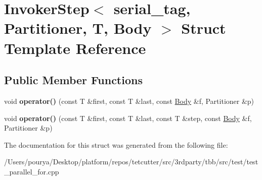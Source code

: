 \hypertarget{structInvokerStep_3_01serial__tag_00_01Partitioner_00_01T_00_01Body_01_4}{}\section{Invoker\+Step$<$ serial\+\_\+tag, Partitioner, T, Body $>$ Struct Template Reference}
\label{structInvokerStep_3_01serial__tag_00_01Partitioner_00_01T_00_01Body_01_4}
\subsection*{Public Member Functions}
\begin{DoxyCompactItemize}
\item 
\hypertarget{structInvokerStep_3_01serial__tag_00_01Partitioner_00_01T_00_01Body_01_4_ac410e45e584eb30d078ddea7cce01acd}{}void {\bfseries operator()} (const T \&first, const T \&last, const \hyperlink{classBody}{Body} \&f, Partitioner \&p)\label{structInvokerStep_3_01serial__tag_00_01Partitioner_00_01T_00_01Body_01_4_ac410e45e584eb30d078ddea7cce01acd}

\item 
\hypertarget{structInvokerStep_3_01serial__tag_00_01Partitioner_00_01T_00_01Body_01_4_aa3926ccc85fdf5d7e761c5add6d072d4}{}void {\bfseries operator()} (const T \&first, const T \&last, const T \&step, const \hyperlink{classBody}{Body} \&f, Partitioner \&p)\label{structInvokerStep_3_01serial__tag_00_01Partitioner_00_01T_00_01Body_01_4_aa3926ccc85fdf5d7e761c5add6d072d4}

\end{DoxyCompactItemize}


The documentation for this struct was generated from the following file\+:\begin{DoxyCompactItemize}
\item 
/\+Users/pourya/\+Desktop/platform/repos/tetcutter/src/3rdparty/tbb/src/test/test\+\_\+parallel\+\_\+for.\+cpp\end{DoxyCompactItemize}
